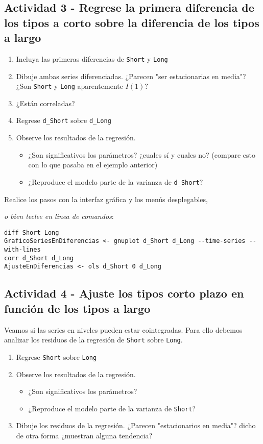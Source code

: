 \documentclass[11pt]{article}
\begin{document}
\vspace{-3pt}

\subsection{Actividad 3 - Regrese la primera diferencia de los tipos a corto sobre la diferencia de los tipos a largo}
\label{sec:orgab6164a}
\begin{enumerate}
\item Incluya las primeras diferencias de \texttt{Short} y \texttt{Long}
\item Dibuje ambas series diferenciadas. ¿Parecen "ser estacionarias en
media"? ¿Son \texttt{Short} y \texttt{Long} aparentemente \(I(1)?\)
\item ¿Están correladas?
\item Regrese \texttt{d\_Short} sobre \texttt{d\_Long}
\item Observe los resultados de la regresión.
\begin{itemize}
\item ¿Son significativos los parámetros? ¿cuales sí y cuales no?
(compare esto con lo que pasaba en el ejemplo anterior)
\item ¿Reproduce el modelo parte de la varianza de \texttt{d\_Short}?
\end{itemize}
\end{enumerate}

Realice los pasos con la interfaz gráfica y los menús desplegables,
{\vspace{0pt} \footnotesize \color{gray!70!black}
\emph{o bien teclee en linea de comandos}:
\begin{verbatim}
diff Short Long
GraficoSeriesEnDiferencias <- gnuplot d_Short d_Long --time-series --with-lines
corr d_Short d_Long
AjusteEnDiferencias <- ols d_Short 0 d_Long
\end{verbatim}
}

\subsection{Actividad 4 - Ajuste los tipos corto plazo en función de los tipos a largo}
\label{sec:org19a9202}

Veamos si las series en niveles pueden estar cointegradas. Para ello
debemos analizar los residuos de la regresión de \texttt{Short} sobre
\texttt{Long}.

\begin{enumerate}
\item Regrese \texttt{Short} sobre \texttt{Long}
\item Observe los resultados de la regresión.
\begin{itemize}
\item ¿Son significativos los parámetros?
\item ¿Reproduce el modelo parte de la varianza de \texttt{Short}?
\end{itemize}
\item Dibuje los residuos de la regresión. ¿Parecen "estacionarios en
media"? dicho de otra forma ¿muestran alguna tendencia?
\end{enumerate}
\end{document}

